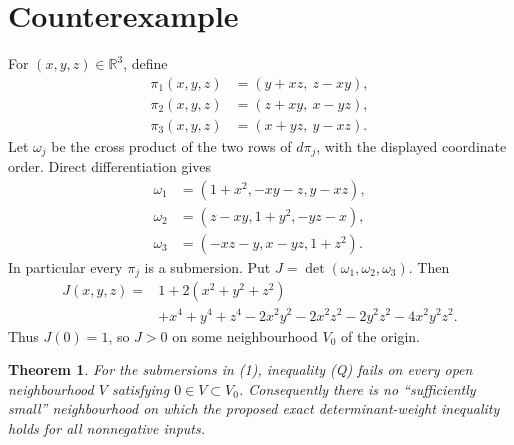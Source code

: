\documentclass[11pt]{article}
\newtheorem{theorem}{Theorem}
\newcommand{\R}{\mathbb R}
\begin{document}
\section{Counterexample}
For $(x,y,z)\in\R^3$, define
\begin{equation}
\begin{aligned}
 \pi_1(x,y,z)&=(y+xz,\ z-xy),\\
 \pi_2(x,y,z)&=(z+xy,\ x-yz),\\
 \pi_3(x,y,z)&=(x+yz,\ y-xz).
\end{aligned}
\end{equation}
Let $\omega_j$ be the cross product of the two rows of $d\pi_j$, with the
displayed coordinate order.  Direct differentiation gives
\begin{equation}
\begin{aligned}
\omega_1&=(1+x^2,-xy-z,y-xz),\\
\omega_2&=(z-xy,1+y^2,-yz-x),\\
\omega_3&=(-xz-y,x-yz,1+z^2).
\end{aligned}
\end{equation}
In particular every $\pi_j$ is a submersion.  Put
$J=\det(\omega_1,\omega_2,\omega_3)$.  Then
\begin{equation}
\begin{aligned}
J(x,y,z)={}&1+2(x^2+y^2+z^2)\\
&+x^4+y^4+z^4-2x^2y^2-2x^2z^2-2y^2z^2
-4x^2y^2z^2.
\end{aligned}
\end{equation}
Thus $J(0)=1$, so $J>0$ on some neighbourhood $V_0$ of the origin.

\begin{theorem}\label{thm:counterexample}
For the submersions in \textup{(1)}, inequality \textup{(Q)} fails on every
open neighbourhood $V$ satisfying $0\in V\subset V_0$.  Consequently there
is no ``sufficiently small'' neighbourhood on which the proposed exact
determinant-weight inequality holds for all nonnegative inputs.
\end{theorem}
\end{document}
